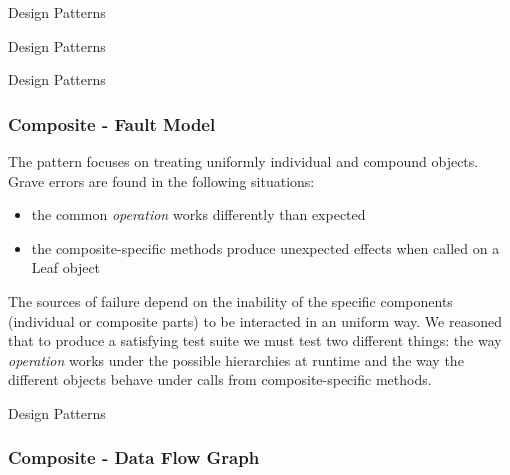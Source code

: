 \documentclass{beamer}
\begin{document}
\begin{section}{Design Patterns}
\begin{subsection}{Design Patterns}
\begin{frame}
	\end{frame}
\end{subsection}

\begin{subsection}{Design Patterns}
	\begin{frame}
		\frametitle{Composite - Fault Model}
		
The pattern focuses on treating uniformly individual and compound objects. Grave errors are found in the following situations:  
\begin{itemize}
	\item the common \textit{operation} works differently than expected
	\item the composite-specific methods produce unexpected effects when called on a Leaf object
\end{itemize}
		\vspace{5mm}
The sources of failure depend on the inability of the specific components (individual or composite parts) to be interacted in an uniform way. We reasoned that to produce a satisfying test suite we must test two different things: the way \textit{operation} works under the possible hierarchies at runtime and the way the different objects behave under calls from composite-specific methods.
		
	\end{frame}
\end{subsection}

\begin{subsection}{Design Patterns}
	\begin{frame}
		\frametitle{Composite - Data Flow Graph}


\end{frame}
\end{subsection}
\end{section}
\end{document}
